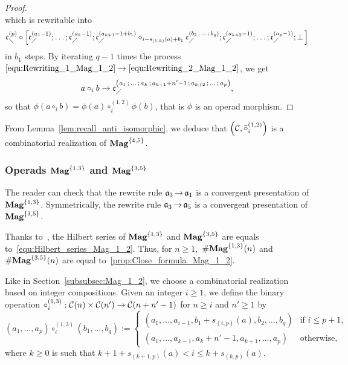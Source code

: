 \begin{proof}
\begin{equation}
  \end{equation}
  which is rewritable into
  \begin{equation} \label{equ:Rewriting_2_Mag_1_2}
    \mathfrak{c}^{\left(p\right)}_{\diagdown} \circ \left[\mathfrak{c}^{\left(a_1-1\right)}_{\diagup}; \dots ; \mathfrak{c}^{\left(a_k-1\right)}_{\diagup};
    \mathfrak{c}^{\left(a_{k+1}-1+b_1\right)}_{\diagup} \circ_{i-s_{(1,k)}(a)+b_1}
    \mathfrak{c}^{\left(b_2 \, ; \, \dots \, ; \, b_q\right)}_{\diagup}  ; \mathfrak{c}^{\left(a_{k+2}-1\right)}_{\diagup} ; \dots;
    \mathfrak{c}^{\left(a_p-1\right)}_{\diagup} ; \perp \, \right]
  \end{equation}
  in $b_1$ steps. By iterating $q-1$ times the process
  $\eqref{equ:Rewriting_1_Mag_1_2} \rightarrow
  \eqref{equ:Rewriting_2_Mag_1_2}$, we get
  \begin{equation}
    a \circ_i b \rightarrow \mathfrak{c}^{\left(a_1 \, ; \, \dots \, ; \, a_{k} \,;\,
    a_{k+1} + n'-1 \, ; \, a_{k+2} \, ; \, \dots \, ; \, a_p\right)}_{\diagup},
  \end{equation}
  so that $\phi(a \circ_i b) = \phi(a) \circ_i^{(1,2)} \phi(b)$, that is
  $\phi$ is an operad morphism.
\end{proof}
\medbreak

From Lemma~\ref{lem:recall_anti_isomorphic}, we deduce that
$\left(\mathcal{C}, \bar{\circ}_i^{(1,2)}\right)$ is a combinatorial
realization of $\mathbf{Mag}^{\{4, 5\}}$.
\medbreak

\subsubsection{Operads $\mathbf{Mag}^{\{1, 3\}}$ and $\mathbf{Mag}^{\{3, 5\}}$}
The reader can check that the rewrite rule $\mathfrak{a}_3 \operatorname{\to} \mathfrak{a}_1$ is a
convergent presentation of $\mathbf{Mag}^{\{1, 3\}}$. Symmetrically, the rewrite
rule $\mathfrak{a}_3 \operatorname{\to} \mathfrak{a}_5$ is a convergent presentation of
$\mathbf{Mag}^{\{3, 5\}}$.
\medbreak

Thanks to~\cite{Gir18}, the Hilbert series of $\mathbf{Mag}^{\{1, 3\}}$ and
$\mathbf{Mag}^{\{3, 5\}}$ are equals to~\eqref{equ:Hilbert_series_Mag_1_2}. Thus,
for $n \geq 1,$ $\# \mathbf{Mag}^{\{1, 3\}}(n)$ and $\# \mathbf{Mag}^{\{3, 5\}}(n)$ are
equal to~\eqref{prop:Close_formula_Mag_1_2}.
\medbreak

Like in Section~\ref{subsubsec:Mag_1_2}, we choose a combinatorial
 realization based on
integer compositions. Given an integer $i \geq 1$, we define the
binary operation
$\circ_i^{(1,3)} : \mathcal{C}(n) \times \mathcal{C}(n')\rightarrow
\mathcal{C}(n + n' -1)$ for
$n \geq i$ and $n' \geq 1$ by
\begin{equation}
    \left(a_1, \dots, a_p\right) \circ_i^{(1,3)}
    \left(b_1, \dots, b_{q}\right)
    :=
    \begin{cases}
        \left(a_1, \dots ,a_{i-1}, b_1 + s_{(i,p)}(a),
        b_2,\dots,b_{q}\right) &
        \mbox{if } i \leq p + 1, \\
        \left(a_1, \dots, a_{k-1}, a_{k} + n'-1, a_{k+1},
        \dots,a_{p}\right)
            & \mbox{otherwise},
    \end{cases}
\end{equation}
where $k \geq 0$ is such that
$k+1 + s_{(k+1,p)}(a) < i \leq k + s_{(k,p)}(a)$.
\medbreak

